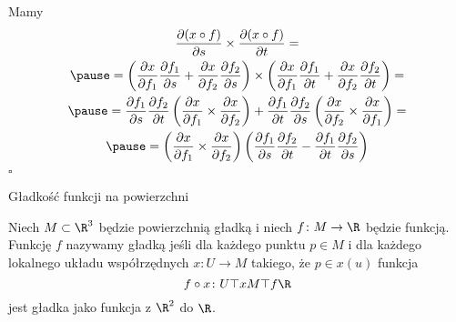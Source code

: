 \begin{frame}
Mamy
\begin{multline*}
\frac{\partial (x\circ f)}{\partial s}\times 
\frac{\partial (x\circ f)}{\partial t}=\\\pause
=\left(\frac{\partial x}{\partial f_1}\frac{\partial f_1}{\partial s}+
\frac{\partial x}{\partial f_2}\frac{\partial f_2}{\partial s}\right) \times
\left(\frac{\partial x}{\partial f_1}\frac{\partial f_1}{\partial t}+
\frac{\partial x}{\partial f_2}\frac{\partial f_2}{\partial t}\right)=\\ \pause
=\frac{\partial f_1}{\partial s}\frac{\partial f_2}{\partial t}
\left(\frac{\partial x}{\partial f_1}\times 
\frac{\partial x}{\partial f_2}\right)+\frac{\partial f_1}{\partial t} 
\frac{\partial f_2}{\partial s}\left(\frac{\partial x}{\partial f_2}\times 
\frac{\partial x}{\partial f_1}\right)=\\\pause
=\left(\frac{\partial x}{\partial f_1}\times 
\frac{\partial x}{\partial f_2}\right) 
\left(\frac{\partial f_1}{\partial s}\frac{\partial f_2}{\partial t} - 
\frac{\partial f_1}{\partial t}\frac{\partial f_2}{\partial s}\right)
\end{multline*}
\hfill $\square$

\end{frame}
\begin{frame}{Gładkość funkcji na powierzchni}

\begin{definicja} \label{def:smooth_fun}
Niech $M\subset \R^3$ będzie powierzchnią gładką i niech $f\colon M\to \R$ 
będzie funkcją. Funkcję $f$ nazywamy gładką jeśli dla każdego punktu $p\in M$ i 
dla każdego lokalnego układu współrzędnych $x\colon U\to M$ takiego, że $p\in 
x(u)$ funkcja \[f\circ x\colon U\top{x}M\top{f}\R\]
jest gładka jako funkcja z $\R^2$ do $\R$.
\end{definicja}

\end{frame}
